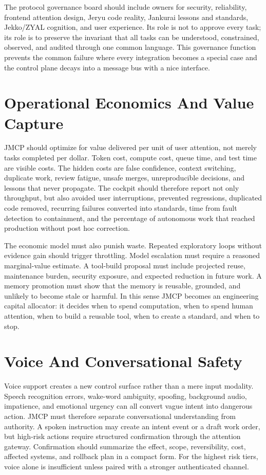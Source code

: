 \documentclass[10pt,journal,onecolumn]{IEEEtran}
\begin{document}
The protocol governance board should include owners for security, reliability, frontend attention design, Jeryu code reality, Jankurai lessons and standards, Jekko/ZYAL cognition, and user experience.  Its role is not to approve every task; its role is to preserve the invariant that all tasks can be understood, constrained, observed, and audited through one common language.  This governance function prevents the common failure where every integration becomes a special case and the control plane decays into a message bus with a nice interface.

\section{Operational Economics And Value Capture}
JMCP should optimize for value delivered per unit of user attention, not merely tasks completed per dollar.  Token cost, compute cost, queue time, and test time are visible costs.  The hidden costs are false confidence, context switching, duplicate work, review fatigue, unsafe merges, unreproducible decisions, and lessons that never propagate.  The cockpit should therefore report not only throughput, but also avoided user interruptions, prevented regressions, duplicated code removed, recurring failures converted into standards, time from fault detection to containment, and the percentage of autonomous work that reached production without post hoc correction.

The economic model must also punish waste.  Repeated exploratory loops without evidence gain should trigger throttling.  Model escalation must require a reasoned marginal-value estimate.  A tool-build proposal must include projected reuse, maintenance burden, security exposure, and expected reduction in future work.  A memory promotion must show that the memory is reusable, grounded, and unlikely to become stale or harmful.  In this sense JMCP becomes an engineering capital allocator: it decides when to spend computation, when to spend human attention, when to build a reusable tool, when to create a standard, and when to stop.

\section{Voice And Conversational Safety}
Voice support creates a new control surface rather than a mere input modality.  Speech recognition errors, wake-word ambiguity, spoofing, background audio, impatience, and emotional urgency can all convert vague intent into dangerous action.  JMCP must therefore separate conversational understanding from authority.  A spoken instruction may create an intent event or a draft work order, but high-risk actions require structured confirmation through the attention gateway.  Confirmation should summarize the effect, scope, reversibility, cost, affected systems, and rollback plan in a compact form.  For the highest risk tiers, voice alone is insufficient unless paired with a stronger authenticated channel.
\end{document}

